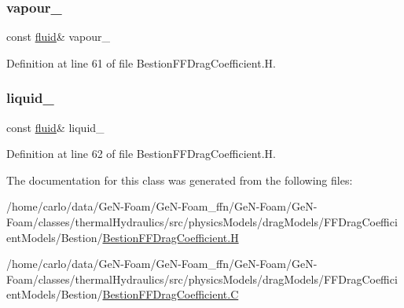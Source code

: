 \subsubsection{\texorpdfstring{vapour\+\_\+}{vapour\_}}
{\footnotesize\ttfamily const \hyperlink{classFoam_1_1fluid}{fluid}\& vapour\+\_\+\hspace{0.3cm}{\ttfamily [protected]}}



Definition at line 61 of file Bestion\+F\+F\+Drag\+Coefficient.\+H.

\mbox{\label{classFoam_1_1FFDragCoefficientModels_1_1Bestion_a908415555f3c334379400a3eb5759639}} 
\subsubsection{\texorpdfstring{liquid\+\_\+}{liquid\_}}
{\footnotesize\ttfamily const \hyperlink{classFoam_1_1fluid}{fluid}\& liquid\+\_\+\hspace{0.3cm}{\ttfamily [protected]}}



Definition at line 62 of file Bestion\+F\+F\+Drag\+Coefficient.\+H.



The documentation for this class was generated from the following files\+:\begin{DoxyCompactItemize}
\item 
/home/carlo/data/\+Ge\+N-\/\+Foam/\+Ge\+N-\/\+Foam\+\_\+ffn/\+Ge\+N-\/\+Foam/\+Ge\+N-\/\+Foam/classes/thermal\+Hydraulics/src/physics\+Models/drag\+Models/\+F\+F\+Drag\+Coefficient\+Models/\+Bestion/\hyperlink{BestionFFDragCoefficient_8H}{Bestion\+F\+F\+Drag\+Coefficient.\+H}\item 
/home/carlo/data/\+Ge\+N-\/\+Foam/\+Ge\+N-\/\+Foam\+\_\+ffn/\+Ge\+N-\/\+Foam/\+Ge\+N-\/\+Foam/classes/thermal\+Hydraulics/src/physics\+Models/drag\+Models/\+F\+F\+Drag\+Coefficient\+Models/\+Bestion/\hyperlink{BestionFFDragCoefficient_8C}{Bestion\+F\+F\+Drag\+Coefficient.\+C}\end{DoxyCompactItemize}
